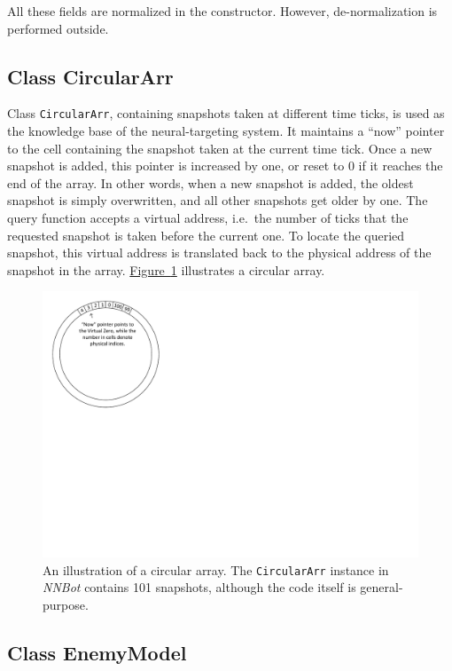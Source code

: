 \documentclass[11pt,a4paper]{article}
\begin{document}
All these fields are normalized in the constructor. However, de-normalization is performed outside.

\subsection{Class CircularArr}

Class \texttt{CircularArr}, containing snapshots taken at different time ticks,  is used as the knowledge base of the neural-targeting system. It maintains a ``now'' pointer to the cell containing the snapshot taken at the current time tick. Once a new snapshot is added, this pointer is increased by one, or reset to 0 if it reaches the end of the array. In other words, when a new snapshot is added, the oldest snapshot is simply overwritten, and all other snapshots get older by one. The query function accepts a virtual address, i.e.\ the number of ticks that the requested snapshot is taken before the current one. To locate the queried snapshot, this virtual address is translated back to the physical address of the snapshot in the array. \hyperref[fig:circle]{Figure~\ref{fig:circle}} illustrates a circular array.

\begin{figure}[h]
	\centering
	\includegraphics[scale=0.85]{circle.pdf}
	\caption{An illustration of a circular array. The \texttt{CircularArr} instance in \emph{NNBot} contains 101 snapshots, although the code itself is general-purpose.}
	\label{fig:circle}
\end{figure}

\subsection{Class EnemyModel}
\label{sec:model}
\end{document}
